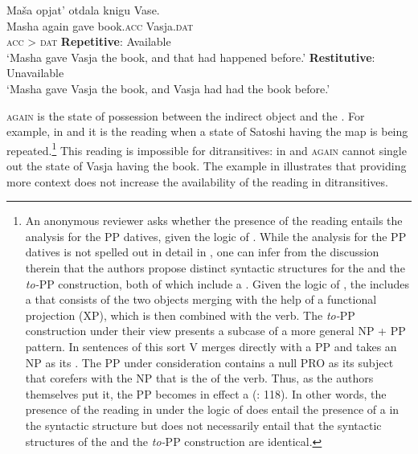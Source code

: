 \documentclass[output=paper]{langscibook}
\begin{document}
 \ea\label{ex:bondarenko:6}
\gll Maša opjat’ otdala knigu Vase.\\
     Masha again gave book.\textsc{acc} Vasja.\textsc{dat}\\\hfill\textsc{acc} > \textsc{dat}
\ea \textbf{Repetitive}: Available\\`Masha gave Vasja the book, and that had happened before.'
\ex \textbf{Restitutive}: Unavailable\\`Masha gave Vasja the book, and Vasja had had the book   before.'
\z
\z

\largerpage[-3]
 \textsc{again}{ is the state of possession between the indirect object and the . For example, in  and  it is the reading when a state of Satoshi having the map is being repeated.}\footnote{An anonymous reviewer asks whether the presence of the  reading entails the  analysis for the PP datives, given the logic of \citet{Beck-Johnson2004}. While the analysis for the PP datives is not spelled out in detail in \citet{Beck-Johnson2004}, one can infer from the discussion therein that the authors propose distinct syntactic structures for the  and the \textit{to-}PP construction, both of which include a . Given the logic of \citet{Beck-Johnson2004}, the  includes a  that consists of the two objects merging with the help of a functional projection (XP), which is then combined with the verb. The \textit{to-}PP construction under their view presents a subcase of a more general NP + PP pattern. In sentences of this sort V merges directly with a PP and takes an NP as its . The PP under consideration contains a null PRO as its subject that corefers with the NP that is the  of the verb. Thus, as the authors themselves put it, the PP becomes in effect a  (\citealt{Beck-Johnson2004}: 118). In other words, the presence of the  reading in  under the logic of \citet{Beck-Johnson2004} does entail the presence of a  in the syntactic structure but does not necessarily entail that the syntactic structures of the  and the \textit{to-}PP construction are identical.}{ This reading is impossible for  ditransitives: in  and } \textsc{again}{ cannot single out the state of Vasja having the book. The example in  illustrates that providing more context does not increase the availability of the  reading in  ditransitives.}
\end{document}
